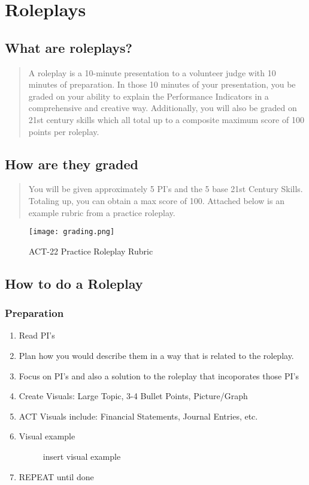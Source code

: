 \chapter{Roleplays}

\section*{What are roleplays?}
\begin{quote}
A roleplay is a 10-minute presentation to a volunteer judge with 10 minutes of preparation. 
In those 10 minutes of your presentation, you be graded on your ability to explain the Performance Indicators 
in a comprehensive and creative way. Additionally, you will also be graded on 21st century skills
which all total up to a composite maximum score of 100 points per roleplay. 
\end{quote} 

\section*{How are they graded}
\begin{quote}
You will be given approximately 5 PI's and the 5 base 21st Century Skills.
Totaling up, you can obtain a max score of 100. Attached below is an example
rubric from a practice roleplay.

\end{quote}

\begin{figure}[H]
    \center
    \texttt{[image: grading.png]}
    \caption[short]{ACT-22 Practice Roleplay Rubric}
\end{figure}

\section*{How to do a Roleplay}

\subsection*{Preparation}
\begin{enumerate}
    \item Read PI's 
    \item Plan how you would describe them in a way that is related to the roleplay.
    \item Focus on PI's and also a solution to the roleplay that incoporates those PI's
    \item Create Visuals: Large Topic, 3-4 Bullet Points, Picture/Graph 
    \item ACT Visuals include: Financial Statements, Journal Entries, etc.
    \item Visual example
    \begin{figure}[H]
        insert visual example 
    \end{figure}
    \item REPEAT until done 
\end{enumerate}

